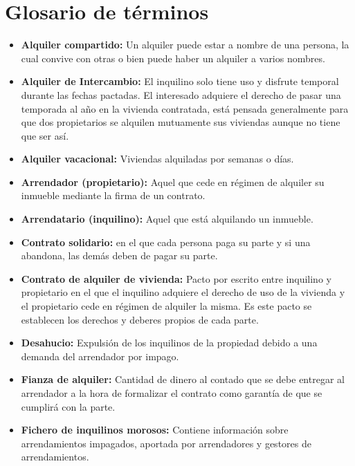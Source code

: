 \chapter{Glosario de términos}

\begin{itemize}

\item \textbf{Alquiler compartido:} Un alquiler puede estar a nombre de una persona, la cual convive con otras o bien puede haber un alquiler a varios nombres. 

\item \textbf{Alquiler de Intercambio:} El inquilino solo tiene uso y disfrute temporal durante las fechas pactadas. El interesado adquiere el derecho de pasar una temporada al año en la vivienda contratada, está pensada generalmente para que dos propietarios se alquilen mutuamente sus viviendas aunque no tiene que ser así.

\item \textbf{Alquiler vacacional:}
Viviendas alquiladas por semanas o días.

\item \textbf{Arrendador (propietario):} Aquel que cede en régimen de alquiler su inmueble mediante la firma de un contrato. 

\item \textbf{Arrendatario (inquilino):} Aquel que está alquilando un inmueble.

\item \textbf{Contrato solidario:} en el que cada persona paga su parte y si una abandona, las demás deben de pagar su parte.

\item \textbf{Contrato de alquiler de vivienda:} Pacto por escrito entre inquilino y propietario en el que el inquilino adquiere el derecho de uso de la vivienda y el propietario cede en régimen de alquiler la misma. Es este pacto se establecen los derechos y deberes propios de cada parte.

\item \textbf{Desahucio:} Expulsión de los inquilinos de la propiedad debido a una demanda del arrendador por impago.

\item \textbf{Fianza de alquiler:} Cantidad de dinero al contado que se debe entregar al arrendador a la hora de formalizar el contrato como garantía de que se cumplirá con la parte.

\item \textbf{Fichero de inquilinos morosos:} Contiene información sobre arrendamientos impagados, aportada por arrendadores y gestores de arrendamientos.


\end{itemize}
